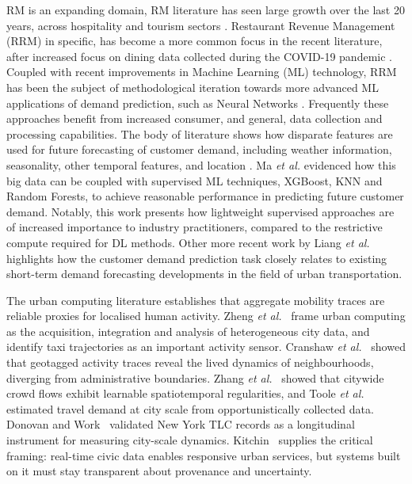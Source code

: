 \documentclass[conference]{IEEEtran}
\begin{document}
RM is an expanding domain, RM literature has seen large growth over the last 20 years, across hospitality and tourism sectors \cite{subying2023bibliometric}. Restaurant Revenue Management (RRM) in specific, has become a more common focus in the recent literature, after increased focus on dining data collected during the COVID-19 pandemic \cite{bujalance2025restaurant}. Coupled with recent improvements in Machine Learning (ML) technology, RRM has been the subject of methodological iteration towards more advanced ML applications of demand prediction, such as Neural Networks \cite{choi2022review}. Frequently these approaches benefit from increased consumer, and general, data collection and processing capabilities. The body of literature shows how disparate features are used for future forecasting of customer demand, including weather information, seasonality, other temporal features, and location \cite{liang2023poisson}\cite{ma2018predicting}\cite{chae2024value}. Ma \textit{et al.} \cite{ma2018predicting} evidenced how this big data can be coupled with supervised ML techniques, XGBoost, KNN and Random Forests, to achieve reasonable performance in predicting future customer demand. Notably, this work presents how lightweight supervised approaches are of increased importance to industry practitioners, compared to the restrictive compute required for DL methods. Other more recent work by Liang \textit{et al.} \cite{liang2023poisson} highlights how the customer demand prediction task closely relates to existing short-term demand forecasting developments in the field of urban transportation.

The urban computing literature establishes that aggregate mobility traces are reliable proxies for localised human activity. Zheng \textit{et al.}~\cite{zheng2014urban} frame urban computing as the acquisition, integration and analysis of heterogeneous city data, and identify taxi trajectories as an important activity sensor. Cranshaw \textit{et al.}~\cite{cranshaw2012livehoods} showed that geotagged activity traces reveal the lived dynamics of neighbourhoods, diverging from administrative boundaries. Zhang \textit{et al.}~\cite{zhang2017deep} showed that citywide crowd flows exhibit learnable spatiotemporal regularities, and Toole \textit{et al.}~\cite{toole2015path} estimated travel demand at city scale from opportunistically collected data. Donovan and Work~\cite{donovan2017empiically} validated New York TLC records as a longitudinal instrument for measuring city-scale dynamics. Kitchin~\cite{kitchin2014real} supplies the critical framing: real-time civic data enables responsive urban services, but systems built on it must stay transparent about provenance and uncertainty.
\end{document}
